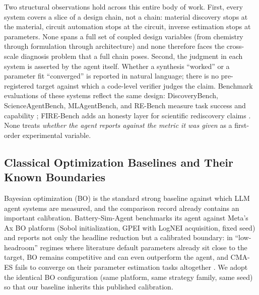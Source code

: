 Two structural observations hold across this entire body of work. First,
every system covers a slice of a design chain, not a chain: material
discovery stops at the material, circuit automation stops at the circuit,
inverse estimation stops at parameters. None spans a full set of coupled
design variables (from chemistry through formulation through architecture) and
none therefore faces the cross-scale diagnosis problem that a full chain
poses. Second, the judgment in each system is asserted by the agent itself.
Whether a synthesis ``worked'' or a parameter fit ``converged'' is reported in
natural language; there is no pre-registered target against which a
code-level verifier judges the claim. Benchmark evaluations of these systems
reflect the same design: DiscoveryBench, ScienceAgentBench, MLAgentBench, and
RE-Bench measure task success and capability \cite{discoverybench2024,
scienceagentbench2024, mlagentbench2023, rebench2024}; FIRE-Bench adds an
honesty layer for scientific rediscovery claims \cite{firebench2026}. None
treats \emph{whether the agent reports against the metric it was given} as a
first-order experimental
variable.

\subsection{Classical Optimization Baselines and Their Known Boundaries}

Bayesian optimization (BO) is the standard strong baseline against which LLM
agent systems are measured, and the comparison record already contains an
important calibration. Battery-Sim-Agent benchmarks its agent against
Meta's Ax BO platform (Sobol initialization, GPEI with LogNEI acquisition,
fixed seed) and reports not only the headline reduction but a
calibrated boundary: in ``low-headroom'' regimes where literature default parameters
already sit close to the target, BO remains competitive and can even
outperform the agent, and CMA-ES fails to converge on their parameter
estimation tasks altogether \cite{chen2026battery}. We adopt the identical BO
configuration (same platform, same strategy family, same seed) so that our
baseline inherits this published calibration.

